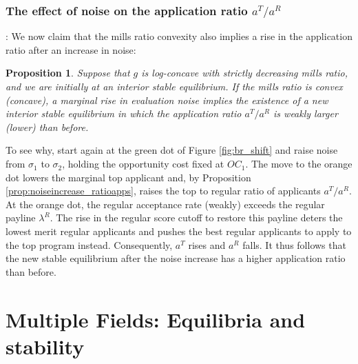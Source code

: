 \documentclass[12pt,reqno]{amsart}
\newtheorem{proposition}{Proposition}
\theoremstyle{definition}
\theoremstyle{plain} %
\begin{document}
\subsubsection{The effect of noise on the application ratio $a^T/a^R$}: We now claim that the mills ratio convexity also implies a rise in the application ratio after an increase in noise:

\begin{proposition}\label{prop:noise_ratio}
Suppose that $g$ is log-concave with strictly decreasing mills ratio, and we are initially at an interior stable equilibrium. If the mills ratio is convex (concave), a marginal rise in evaluation noise implies the existence of a new interior stable equilibrium in which the application ratio $a^T/a^R$ is weakly larger (lower) than before.
\end{proposition}

\noindent To see why, start again at the green dot of Figure \ref{fig:br_shift} and raise noise from $\sigma_1$ to $\sigma_2$, holding the opportunity cost fixed at $OC_1$. The move to the orange dot lowers the marginal top applicant and, by Proposition \ref{prop:noiseincrease_ratioapps}, raises the top to regular ratio of applicants $a^T/a^R$. At the orange dot, the regular acceptance rate (weakly) exceeds the regular payline $\lambda^R$. The rise in the regular score cutoff to restore this payline deters the lowest merit regular applicants and pushes the best regular applicants to apply to the top program instead. Consequently, $a^T$ rises and $a^R$ falls. It thus follows that the new stable equilibrium after the noise increase has a higher application ratio than before. 

\section{Multiple Fields: Equilibria and stability}
\end{document}
